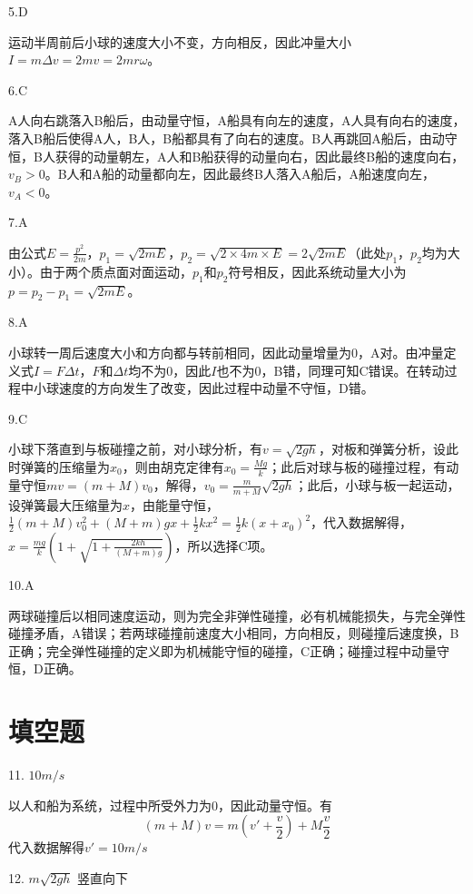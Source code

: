 \documentclass[b5paper,opensource]{./template/qyxf-book}
\begin{document}
		5.D
		
		运动半周前后小球的速度大小不变，方向相反，因此冲量大小\(I=m\Delta v=2mv=2mr \omega\)。
		
		6.C
		
		A人向右跳落入B船后，由动量守恒，A船具有向左的速度，A人具有向右的速度，落入B船后使得A人，B人，B船都具有了向右的速度。B人再跳回A船后，由动守恒，B人获得的动量朝左，A人和B船获得的动量向右，因此最终B船的速度向右，\(v_B>0\)。B人和A船的动量都向左，因此最终B人落入A船后，A船速度向左，\(v_A<0\)。
		
		7.A
		
		由公式\(E=\frac{p^2}{2m}\)，\(p_1=\sqrt{2mE}\)，\(p_2=\sqrt{2\times 4m\times E}=2\sqrt{2mE}\)（此处\(p_1\)，\(p_2\)均为大小）。由于两个质点面对面运动，\(p_1\)和\(p_2\)符号相反，因此系统动量大小为\(p=p_2-p_1=\sqrt{2mE}\)。
		
		8.A
		
		小球转一周后速度大小和方向都与转前相同，因此动量增量为0，A对。由冲量定义式\(I=F\Delta t\)，\(F\)和\(\Delta t\)均不为0，因此\(I\)也不为0，B错，同理可知C错误。在转动过程中小球速度的方向发生了改变，因此过程中动量不守恒，D错。
		
		9.C
		
		小球下落直到与板碰撞之前，对小球分析，有\(v=\sqrt{2gh}\)，对板和弹簧分析，设此时弹簧的压缩量为\(x_0\)，则由胡克定律有\(x_0=\frac{Mg}{k}\)；此后对球与板的碰撞过程，有动量守恒\(mv=(m+M)v_0\)，解得，\(v_0=\frac{m}{m+M}\sqrt{2gh}\)；此后，小球与板一起运动，设弹簧最大压缩量为\(x\)，由能量守恒，\(\frac{1}{2}(m+M)v_0^2+(M+m)gx+\frac{1}{2}kx^2=\frac{1}{2}k(x+x_0)^2\)，代入数据解得，\(x=\frac{mg}{k}(1+\sqrt{1+\frac{2kh}{(M+m)g}})\)，所以选择C项。
		
		10.A
		
		两球碰撞后以相同速度运动，则为完全非弹性碰撞，必有机械能损失，与完全弹性碰撞矛盾，A错误；若两球碰撞前速度大小相同，方向相反，则碰撞后速度换，B正确；完全弹性碰撞的定义即为机械能守恒的碰撞，C正确；碰撞过程中动量守恒，D正确。
	\section{填空题}
		11. $10m/s$
		
		以人和船为系统，过程中所受外力为$ 0 $，因此动量守恒。有
		\begin{equation*}
		(m+M)v=m(v'+\frac{v}{2})+M\frac{v}{2} 
		\end{equation*}
		代入数据解得$ v'=10m/s $
		
		12. $ m\sqrt{2gh} $ \hspace{4em} 竖直向下
		
\end{document}
